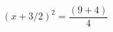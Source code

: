 \documentclass[preview]{standalone}
\begin{document}
\begin{align*}
(x + 3/2) ^2 = \dfrac{(9 + 4)}{4 }
\end{align*}
\end{document}

